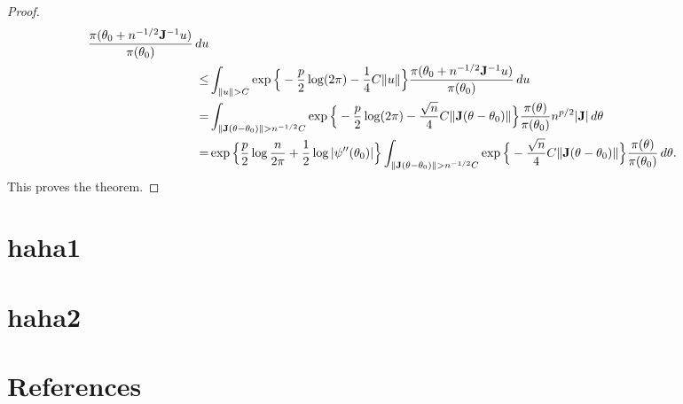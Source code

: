 \documentclass[11pt, letterpaper]{article}
\theoremstyle{plain}
\theoremstyle{definition}
\theoremstyle{remark}
\begin{document}
\begin{proof}
$$\begin{aligned}
\frac{\pi(\theta_0+n^{-1/2} \BJ^{-1}u)}{\pi(\theta_0)}\, du
\\
    \leq & 
    \int_{\|u\|> C}
\exp\Big\{
-\frac{p}{2}\log (2\pi)
    -\frac{1}{4} C\|u\|
    \Big\}
\frac{\pi(\theta_0+n^{-1/2} \BJ^{-1}u)}{\pi(\theta_0)}\, du\\
    = & 
    \int_{\|\BJ(\theta-\theta_0)\|>n^{-1/2} C}
\exp\Big\{
-\frac{p}{2}\log (2\pi)
    -\frac{\sqrt{n}}{4} C\|\BJ(\theta-\theta_0)\|
    \Big\}
\frac{\pi(\theta)}{\pi(\theta_0)} n^{p/2} |\BJ| \, d\theta\\
    = & 
\exp\Big\{
    \frac{p}{2}\log \frac{n}{2\pi}
    +\frac{1}{2}\log |\psi''(\theta_0)|
    \Big\}
    \int_{\|\BJ(\theta-\theta_0)\|>n^{-1/2} C}
    \exp\Big\{
    -\frac{\sqrt{n}}{4} C\|\BJ(\theta-\theta_0)\|
    \Big\}
\frac{\pi(\theta)}{\pi(\theta_0)} \, d\theta.
\end{aligned}
$$
This proves the theorem.
\end{proof}


\begin{appendices}
    \section{haha1}
    \section{haha2}
\end{appendices}


\section*{References}



\end{document}
